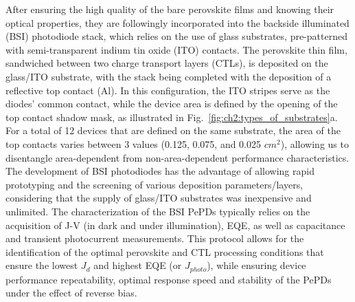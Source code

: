 After ensuring the high quality of the bare perovskite films and knowing their optical properties, they are followingly incorporated into the backside illuminated (BSI) photodiode stack, which relies on the use of glass substrates, pre-patterned with semi-transparent indium tin oxide (ITO) contacts. The perovskite thin film, sandwiched between two charge transport layers (CTLs), is deposited on the glass/ITO substrate, with the stack being completed with the deposition of a reflective top contact (Al). In this configuration, the ITO stripes serve as the diodes' common contact, while the device area is defined by the opening of the top contact shadow mask, as illustrated in Fig.~\ref{fig:ch2:types_of_substrates}a. For a total of 12 devices that are defined on the same substrate, the area of the top contacts varies between 3 values (0.125, 0.075, and 0.025 $cm^2$), allowing us to disentangle area-dependent from non-area-dependent performance characteristics. The development of BSI photodiodes has the advantage of allowing rapid prototyping and the screening of various deposition parameters/layers, considering that the supply of glass/ITO substrates was inexpensive and unlimited. The characterization of the BSI PePDs typically relies on the acquisition of J-V (in dark and under illumination), EQE, as well as capacitance and transient photocurrent measurements. This protocol allows for the identification of the optimal perovskite and CTL processing conditions that ensure the lowest $J_d$ and highest EQE (or $J_{photo}$), while ensuring device performance repeatability, optimal response speed and stability of the PePDs under the effect of reverse bias. 

